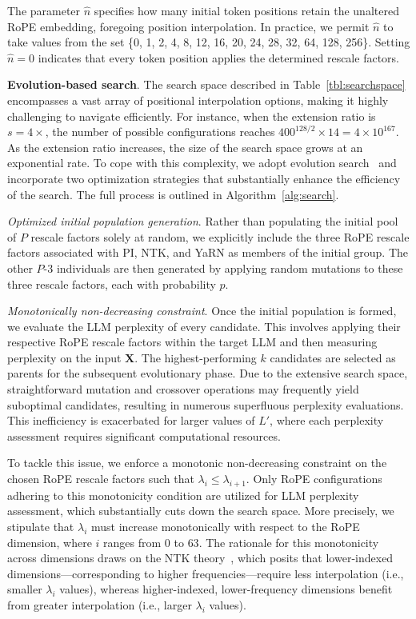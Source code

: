 The parameter $\hat{n}$ specifies how many initial token positions retain the unaltered RoPE embedding, foregoing position interpolation. In practice, we permit $\hat{n}$ to take values from the set \{0, 1, 2, 4, 8, 12, 16, 20, 24, 28, 32, 64, 128, 256\}. Setting $\hat{n}=0$ indicates that every token position applies the determined rescale factors.

\textbf{Evolution-based search}. The search space described in Table~\ref{tbl:searchspace} encompasses a vast array of positional interpolation options, making it highly challenging to navigate efficiently. For instance, when the extension ratio is $s=4\times$, the number of possible configurations reaches $400^{128/2}\times14=4\times10^{167}$. As the extension ratio increases, the size of the search space grows at an exponential rate. To cope with this complexity, we adopt evolution search~\cite{guo2020single} and incorporate two optimization strategies that substantially enhance the efficiency of the search. The full process is outlined in Algorithm~\ref{alg:search}.

\textit{Optimized initial population generation}. Rather than populating the initial pool of $P$ rescale factors solely at random, we explicitly include the three RoPE rescale factors associated with PI, NTK, and YaRN as members of the initial group. The other $P$-3 individuals are then generated by applying random mutations to these three rescale factors, each with probability $p$.

\textit{Monotonically non-decreasing constraint}. Once the initial population is formed, we evaluate the LLM perplexity of every candidate. This involves applying their respective RoPE rescale factors within the target LLM and then measuring perplexity on the input $\mathbf{X}$. The highest-performing $k$ candidates are selected as parents for the subsequent evolutionary phase. Due to the extensive search space, straightforward mutation and crossover operations may frequently yield suboptimal candidates, resulting in numerous superfluous perplexity evaluations. This inefficiency is exacerbated for larger values of $L'$, where each perplexity assessment requires significant computational resources.

To tackle this issue, we enforce a monotonic non-decreasing constraint on the chosen RoPE rescale factors such that $\lambda_i \le \lambda_{i+1}$. Only RoPE configurations adhering to this monotonicity condition are utilized for LLM perplexity assessment, which substantially cuts down the search space. More precisely, we stipulate that $\lambda_i$ must increase monotonically with respect to the RoPE dimension, where $i$ ranges from $0$ to $63$. The rationale for this monotonicity across dimensions draws on the NTK theory~\cite{jacot2018neural,tancik2020fourier,ntk}, which posits that lower-indexed dimensions—corresponding to higher frequencies—require less interpolation (i.e., smaller $\lambda_i$ values), whereas higher-indexed, lower-frequency dimensions benefit from greater interpolation (i.e., larger $\lambda_i$ values).

